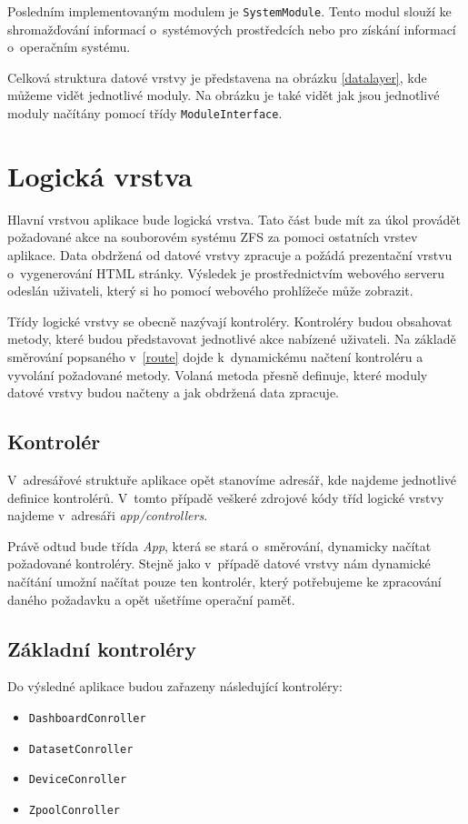     Posledním implementovaným modulem je \verb|SystemModule|. Tento modul slouží ke shromažďování informací o~systémových prostředcích nebo pro získání informací o~operačním systému.
    
    Celková struktura datové vrstvy je představena na obrázku \ref{datalayer}, kde můžeme vidět jednotlivé moduly. Na obrázku je také vidět jak jsou jednotlivé moduly načítány pomocí třídy \verb|ModuleInterface|.
    
\section{Logická vrstva}
Hlavní vrstvou aplikace bude logická vrstva. Tato část bude mít za úkol provádět požadované akce na souborovém systému ZFS za pomoci ostatních vrstev aplikace. Data obdržená od datové vrstvy zpracuje a požádá prezentační vrstvu o~vygenerování HTML stránky. Výsledek je prostřednictvím webového serveru odeslán uživateli, který si ho pomocí webového prohlížeče může zobrazit.

Třídy logické vrstvy se obecně nazývají kontroléry. Kontroléry budou obsahovat metody, které budou představovat jednotlivé akce nabízené uživateli. Na základě směrování popsaného v~\ref{route} dojde k~dynamickému načtení kontroléru a vyvolání požadované metody. Volaná metoda přesně definuje, které moduly datové vrstvy budou načteny a jak obdržená data zpracuje.
    \subsection{Kontrolér}
    V~adresářové struktuře aplikace opět stanovíme adresář, kde najdeme jednotlivé definice kontrolérů. V~tomto případě veškeré zdrojové kódy tříd logické vrstvy najdeme v~adresáři \emph{app/controllers}.

    Právě odtud bude třída \emph{App}, která se stará o~směrování, dynamicky načítat požadované kontroléry. Stejně jako v~případě datové vrstvy nám dynamické načítání umožní načítat pouze ten kontrolér, který potřebujeme ke zpracování daného požadavku a opět ušetříme operační paměť.

    \subsection{Základní kontroléry}
    Do výsledné aplikace budou zařazeny následující kontroléry:
    \begin{itemize}
      \item \verb|DashboardConroller|
      \item \verb|DatasetConroller|
      \item \verb|DeviceConroller|
      \item \verb|ZpoolConroller|
    \end{itemize}

